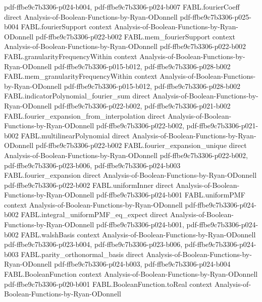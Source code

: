 \begin{theorem}
{    pdf-ffbe9c7b3306-p024-b004,
    pdf-ffbe9c7b3306-p024-b007}
\proofstep
  {FABL.fourierCoeff}
  {direct}
  {Analysis-of-Boolean-Functions-by-Ryan-ODonnell}
  {pdf-ffbe9c7b3306-p025-b004}
\proofstep
  {FABL.fourierSupport}
  {context}
  {Analysis-of-Boolean-Functions-by-Ryan-ODonnell}
  {pdf-ffbe9c7b3306-p022-b002}
\proofstep
  {FABL.mem_fourierSupport}
  {context}
  {Analysis-of-Boolean-Functions-by-Ryan-ODonnell}
  {pdf-ffbe9c7b3306-p022-b002}
\proofstep
  {FABL.granularityFrequencyWithin}
  {context}
  {Analysis-of-Boolean-Functions-by-Ryan-ODonnell}
  {pdf-ffbe9c7b3306-p015-b012,
    pdf-ffbe9c7b3306-p028-b002}
\proofstep
  {FABL.mem_granularityFrequencyWithin}
  {context}
  {Analysis-of-Boolean-Functions-by-Ryan-ODonnell}
  {pdf-ffbe9c7b3306-p015-b012,
    pdf-ffbe9c7b3306-p028-b002}
\proofstep
  {FABL.indicatorPolynomial_fourier_sum}
  {direct}
  {Analysis-of-Boolean-Functions-by-Ryan-ODonnell}
  {pdf-ffbe9c7b3306-p022-b002,
    pdf-ffbe9c7b3306-p021-b002}
\proofstep
  {FABL.fourier_expansion_from_interpolation}
  {direct}
  {Analysis-of-Boolean-Functions-by-Ryan-ODonnell}
  {pdf-ffbe9c7b3306-p022-b002,
    pdf-ffbe9c7b3306-p021-b002}
\proofstep
  {FABL.multilinearPolynomial}
  {direct}
  {Analysis-of-Boolean-Functions-by-Ryan-ODonnell}
  {pdf-ffbe9c7b3306-p022-b002}
\proofstep
  {FABL.fourier_expansion_unique}
  {direct}
  {Analysis-of-Boolean-Functions-by-Ryan-ODonnell}
  {pdf-ffbe9c7b3306-p022-b002,
    pdf-ffbe9c7b3306-p023-b006,
    pdf-ffbe9c7b3306-p024-b003}
\proofstep
  {FABL.fourier_expansion}
  {direct}
  {Analysis-of-Boolean-Functions-by-Ryan-ODonnell}
  {pdf-ffbe9c7b3306-p022-b002}
\proofstep
  {FABL.uniformInner}
  {direct}
  {Analysis-of-Boolean-Functions-by-Ryan-ODonnell}
  {pdf-ffbe9c7b3306-p024-b001}
\proofstep
  {FABL.uniformPMF}
  {context}
  {Analysis-of-Boolean-Functions-by-Ryan-ODonnell}
  {pdf-ffbe9c7b3306-p024-b002}
\proofstep
  {FABL.integral_uniformPMF_eq_expect}
  {direct}
  {Analysis-of-Boolean-Functions-by-Ryan-ODonnell}
  {pdf-ffbe9c7b3306-p024-b001,
    pdf-ffbe9c7b3306-p024-b002}
\proofstep
  {FABL.walshBasis}
  {context}
  {Analysis-of-Boolean-Functions-by-Ryan-ODonnell}
  {pdf-ffbe9c7b3306-p023-b004,
    pdf-ffbe9c7b3306-p023-b006,
    pdf-ffbe9c7b3306-p024-b003}
\proofstep
  {FABL.parity_orthonormal_basis}
  {direct}
  {Analysis-of-Boolean-Functions-by-Ryan-ODonnell}
  {pdf-ffbe9c7b3306-p024-b003,
    pdf-ffbe9c7b3306-p024-b004}
\proofstep
  {FABL.BooleanFunction}
  {context}
  {Analysis-of-Boolean-Functions-by-Ryan-ODonnell}
  {pdf-ffbe9c7b3306-p020-b001}
\proofstep
  {FABL.BooleanFunction.toReal}
  {context}
  {Analysis-of-Boolean-Functions-by-Ryan-ODonnell}

\end{theorem}
